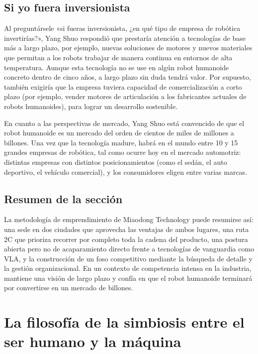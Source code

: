 \documentclass[a4paper]{article}
\begin{document}
\subsection{Si yo fuera inversionista}

Al preguntársele «si fueras inversionista, ¿en qué tipo de empresa de robótica invertirías?», Yang Shuo respondió que prestaría atención a tecnologías de base más a largo plazo, por ejemplo, nuevas soluciones de motores y nuevos materiales que permitan a los robots trabajar de manera continua en entornos de alta temperatura. Aunque esta tecnología no se use en algún robot humanoide concreto dentro de cinco años, a largo plazo sin duda tendrá valor. Por supuesto, también exigiría que la empresa tuviera capacidad de comercialización a corto plazo (por ejemplo, vender motores de articulación a los fabricantes actuales de robots humanoides), para lograr un desarrollo sostenible.

En cuanto a las perspectivas de mercado, Yang Shuo está convencido de que el robot humanoide es un mercado del orden de cientos de miles de millones a billones. Una vez que la tecnología madure, habrá en el mundo entre 10 y 15 grandes empresas de robótica, tal como ocurre hoy en el mercado automotriz: distintas empresas con distintos posicionamientos (como el sedán, el auto deportivo, el vehículo comercial), y los consumidores eligen entre varias marcas.

\subsection{Resumen de la sección}

La metodología de emprendimiento de Miaodong Technology puede resumirse así: una sede en dos ciudades que aprovecha las ventajas de ambos lugares, una ruta 2C que prioriza recorrer por completo toda la cadena del producto, una postura abierta pero no de acaparamiento directo frente a tecnologías de vanguardia como VLA, y la construcción de un foso competitivo mediante la búsqueda de detalle y la gestión organizacional. En un contexto de competencia intensa en la industria, mantiene una visión de largo plazo y confía en que el robot humanoide terminará por convertirse en un mercado de billones.

\section{La filosofía de la simbiosis entre el ser humano y la máquina}
\end{document}
